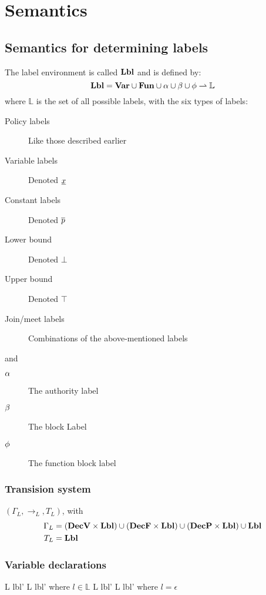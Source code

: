 \section{Semantics}

\subsection{Semantics for determining labels}
The label environment is called $\mathbf{Lbl}$ and is defined by:
\[
  \mathbf{Lbl} = \mathbf{Var} \cup \mathbf{Fun} \cup \alpha \cup \beta \cup \phi \rightharpoonup \mathbb{L}
\]
where $\mathbb{L}$ is the set of all possible labels, with the six types of labels:
\begin{description}
  \item[Policy labels] Like those described earlier
  \item[Variable labels] Denoted $\underline{x}$
  \item[Constant labels] Denoted $\overline{p}$
  \item[Lower bound] Denoted $\bot$
  \item[Upper bound] Denoted $\top$
  \item[Join/meet labels] Combinations of the above-mentioned labels
\end{description}

and

\begin{description}
  \item[$\alpha$] The authority label
  \item[$\beta$] The block Label
  \item[$\phi$] The function block label
\end{description}

\subsubsection{Transision system}
$(\Gamma_{L}, \rightarrow_{L}, T_{L})$, with
\begin{align*}
  \Gamma_{L} & = (\mathbf{DecV} \times \mathbf{Lbl}) \cup (\mathbf{DecF} \times \mathbf{Lbl}) \cup (\mathbf{DecP} \times \mathbf{Lbl}) \cup \mathbf{Lbl} \\
  T_{L} & = \mathbf{Lbl}
\end{align*}

\subsubsection{Variable declarations}

\begin{trules}
        { {L} {lbl'} }
        { {L} {lbl'} }
        {where $l \in \mathbb{L}$}
        { {L} {lbl'} }
        { {L} {lbl'} }
        {where $l = \epsilon$}
\end{trules}

